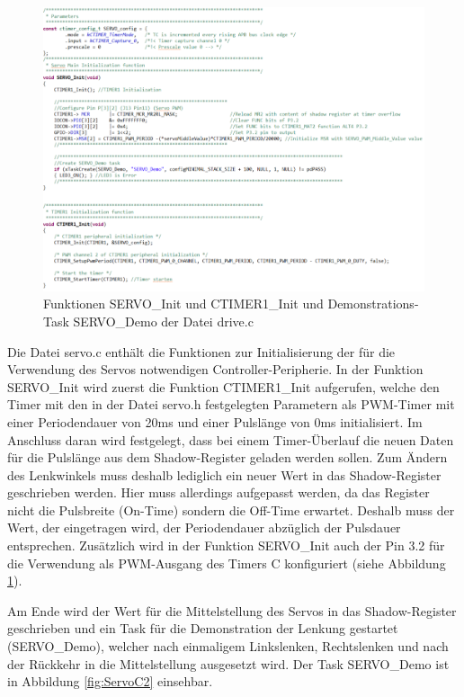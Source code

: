 \begin{figure}[H] %
\includegraphics[width=.95\textwidth]{sec5/images/ServoC1} 
\centering
\captionsetup{width=.95\textwidth}
\caption[Funktionen SERVO\_Init, CTIMER1\_Init und SERVO\_Demo der Datei \glqq{}drive.c\grqq{}]{Funktionen SERVO\_Init und CTIMER1\_Init und Demonstrations-Task SERVO\_Demo der Datei \glqq{}drive.c\grqq{}}\centering
\label{fig:ServoC1}
\end{figure}

Die Datei \glqq{}servo.c\grqq{} enthält die Funktionen zur Initialisierung der für die Verwendung des Servos notwendigen Controller-Peripherie. In der Funktion SERVO\_Init wird zuerst die Funktion CTIMER1\_Init aufgerufen, welche den Timer mit den in der Datei \glqq{}servo.h\grqq{} festgelegten Parametern als \ac{PWM}-Timer mit einer Periodendauer von 20ms und einer Pulslänge von 0ms initialisiert. Im Anschluss daran wird festgelegt, dass bei einem Timer-Überlauf die neuen Daten für die Pulslänge aus dem Shadow-Register geladen werden sollen. Zum Ändern des Lenkwinkels muss deshalb lediglich ein neuer Wert in das Shadow-Register geschrieben werden. Hier muss allerdings aufgepasst werden, da das Register nicht die Pulsbreite (On-Time) sondern die Off-Time erwartet. Deshalb muss der Wert, der eingetragen wird, der Periodendauer abzüglich der Pulsdauer entsprechen. Zusätzlich wird in der Funktion SERVO\_Init auch der Pin 3.2 für die Verwendung als \ac{PWM}-Ausgang des Timers C konfiguriert (siehe Abbildung \ref{fig:ServoC1}).\vspace{11pt}

Am Ende wird der Wert für die Mittelstellung des Servos in das Shadow-Register geschrieben und ein Task für die Demonstration der Lenkung gestartet (SERVO\_Demo), welcher nach einmaligem Linkslenken, Rechtslenken und nach der Rückkehr in die Mittelstellung ausgesetzt wird. Der Task \glqq{}SERVO\_Demo\grqq{} ist in Abbildung \ref{fig:ServoC2} einsehbar.

